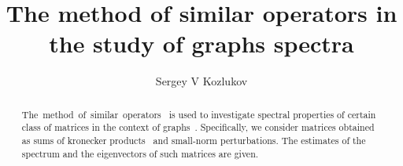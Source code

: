 \documentclass[a4paper]{jpconf}
\begin{document}
\title{The method of similar operators
in the study of graphs spectra}

\author{Sergey V Kozlukov}

\address{{POSITION}, \emph{Voronezh State University}, 1 Universitetskaya Ploshad', Voronezh, RU 394036}


\begin{abstract}
    The~method~of~similar~operators~\cite{baskakov1983methods,baskakov2014memory,baskakov2017method,baskakov2013completeness}
        is used to investigate spectral properties
        of certain class of matrices in the context of graphs~\cite{van2003graphs,cvetkovic1980spectra}.
    Specifically, we consider matrices
        obtained as sums
        of kronecker products~\cite{bellman-matrices-kron}
        and small-norm perturbations.
    The estimates of the spectrum and the eigenvectors
        of such matrices are given.
\end{abstract}
\end{document}
